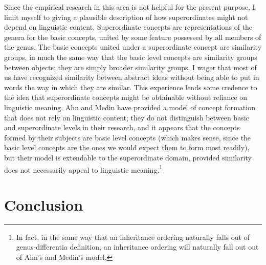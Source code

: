 \documentclass[12pt]{amsart}
\begin{document}
Since the empirical research in this area is not helpful for the present purpose, I limit myself to giving a plausible description of how superordinates might not depend on linguistic content. Superordinate concepts are representations of the genera for the basic concepts, united by some feature possessed by all members of the genus. The basic concepts united under a superordinate concept are similarity groups, in much the same way that the basic level concepts are similarity groups between objects; they are simply broader similarity groups. I wager that most of us have recognized similarity between abstract ideas without being able to put in words the way in which they are similar. This experience lends some credence to the idea that superordinate concepts might be obtainable without reliance on linguistic meaning. Ahn and Medin \cite{ahn_two-stage_1990} \cite{medin_two-stage_1992} have provided a model of concept formation that does not rely on linguistic content; they do not distinguish between basic and superordinate levels in their research, and it appears that the concepts formed by their subjects are basic level concepts (which makes sense, since the basic level concepts are the ones we would expect them to form most readily), but their model is extendable to the superordinate domain, provided similarity does not necessarily appeal to linguistic meaning.\footnote{In fact, in the same way that an inheritance ordering naturally falls out of genus-differentia definition, an inheritance ordering will naturally fall out out of Ahn's and Medin's model.}

\section{Conclusion}




\end{document}
